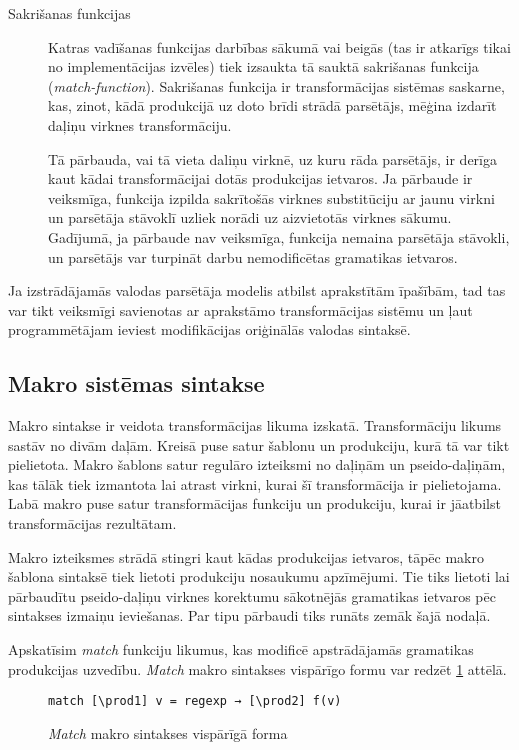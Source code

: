\begin{description}
\item[Sakrišanas funkcijas]
Katras vadīšanas funkcijas darbības sākumā vai beigās (tas ir atkarīgs tikai no implementācijas izvēles) tiek izsaukta tā sauktā sakrišanas funkcija (\emph{match-function}). Sakrišanas funkcija ir transformācijas sistēmas saskarne, kas, zinot, kādā produkcijā uz doto brīdi strādā parsētājs, mēģina izdarīt daļiņu virknes transformāciju.

Tā pārbauda, vai tā vieta daliņu virknē, uz kuru rāda parsētājs, ir derīga kaut kādai transformācijai dotās produkcijas ietvaros. Ja pārbaude ir veiksmīga, funkcija izpilda sakrītošās virknes substitūciju ar jaunu virkni un parsētāja stāvoklī uzliek norādi uz aizvietotās virknes sākumu. Gadījumā,  ja pārbaude nav veiksmīga, funkcija nemaina parsētāja stāvokli, un parsētājs var turpināt darbu nemodificētas gramatikas ietvaros.
\end{description}

Ja izstrādājamās valodas parsētāja modelis atbilst aprakstītām īpašībām, tad tas var tikt veiksmīgi savienotas ar aprakstāmo transformācijas sistēmu un ļaut programmētājam ieviest modifikācijas oriģinālās valodas sintaksē.

\subsection{\label{sbs:sys_macrosyntax}Makro sistēmas sintakse}

Makro sintakse ir veidota transformācijas likuma izskatā. Transformāciju likums sastāv no divām daļām. Kreisā puse satur šablonu un produkciju, kurā tā var tikt pielietota. Makro šablons satur regulāro izteiksmi no daļiņām un pseido-daļiņām, kas tālāk tiek izmantota lai atrast virkni, kurai šī transformācija ir pielietojama. Labā makro puse satur transformācijas funkciju un produkciju, kurai ir jāatbilst transformācijas rezultātam.

Makro izteiksmes strādā stingri kaut kādas produkcijas ietvaros, tāpēc makro šablona sintaksē tiek lietoti produkciju nosaukumu apzīmējumi. Tie tiks lietoti lai pārbaudītu pseido-daļiņu virknes korektumu sākotnējās gramatikas ietvaros pēc sintakses izmaiņu ieviešanas. Par tipu pārbaudi tiks runāts zemāk šajā nodaļā.

Apskatīsim \textit{match} funkciju likumus, kas modificē apstrādājamās gramatikas produkcijas uzvedību. \emph{Match} makro sintakses vispārīgo formu var redzēt \ref{fig:matchsyntax} attēlā.

\begin{figure}[h!]
\begin{verbatim}
match [\prod1] v = regexp → [\prod2] f(v)
\end{verbatim}
\caption{\label{fig:matchsyntax}\emph{Match} makro sintakses vispārīgā forma}
\end{figure}

